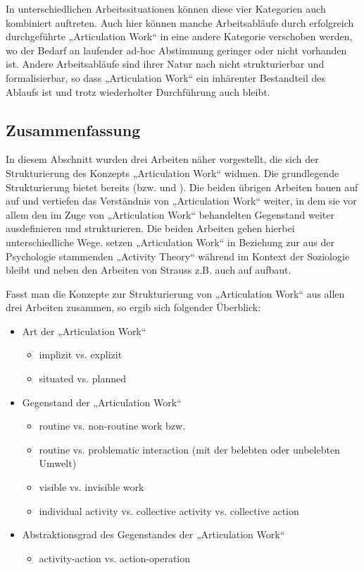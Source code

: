 In unterschiedlichen Arbeitssituationen können diese vier Kategorien auch kombiniert auftreten. Auch hier können manche Arbeitsabläufe durch erfolgreich durchgeführte „Articulation Work“ in eine andere Kategorie verschoben werden, wo der Bedarf an laufender ad-hoc Abstimmung geringer oder nicht vorhanden ist. Andere Arbeitsabläufe sind ihrer Natur nach nicht strukturierbar und formalisierbar, so dass „Articulation Work“ ein inhärenter Bestandteil des Ablaufs ist und trotz wiederholter Durchführung auch bleibt.

\subsection{Zusammenfassung} %
\label{sub:aw_zusammenfassung}

In diesem Abschnitt wurden drei Arbeiten näher vorgestellt, die sich der  Strukturierung des Konzepts „Articulation Work“ widmen. Die grundlegende Strukturierung bietet bereits \citet{Strauss85} (bzw. \citet{Strauss88} und \citet{Strauss93}). Die beiden übrigen Arbeiten bauen auf \citeauthor{Strauss85} auf und vertiefen das Verständnis von „Articulation Work“ weiter, in dem sie vor allem den im Zuge von „Articulation Work“ behandelten Gegenstand weiter ausdefinieren und strukturieren. Die beiden Arbeiten gehen hierbei unterschiedliche Wege. \citet{Fjuk97} setzen „Articulation Work“ in Beziehung zur aus der Psychologie stammenden „Activity Theory“ während \citet{Hampson05} im Kontext der Soziologie bleibt und neben den Arbeiten von Strauss z.B. auch auf \citep{Star99} aufbaut.

Fasst man die Konzepte zur Strukturierung von „Articulation Work“ aus allen drei Arbeiten zusammen, so ergib sich folgender Überblick: 

\begin{itemize}
	\item Art der „Articulation Work“
	\begin{itemize}
		\item implizit vs. explizit
		\item situated vs. planned
	\end{itemize}
	\item Gegenstand der „Articulation Work“
	\begin{itemize}
		\item routine vs. non-routine work bzw.
		\item routine vs. problematic interaction (mit der belebten oder unbelebten Umwelt)
		\item visible vs. invisible work
		\item individual activity vs. collective activity vs. collective action
	\end{itemize}
	\item Abstraktionsgrad des Gegenstandes der „Articulation Work“
	\begin{itemize}
		\item activity-action vs. action-operation
	\end{itemize}
\end{itemize}

